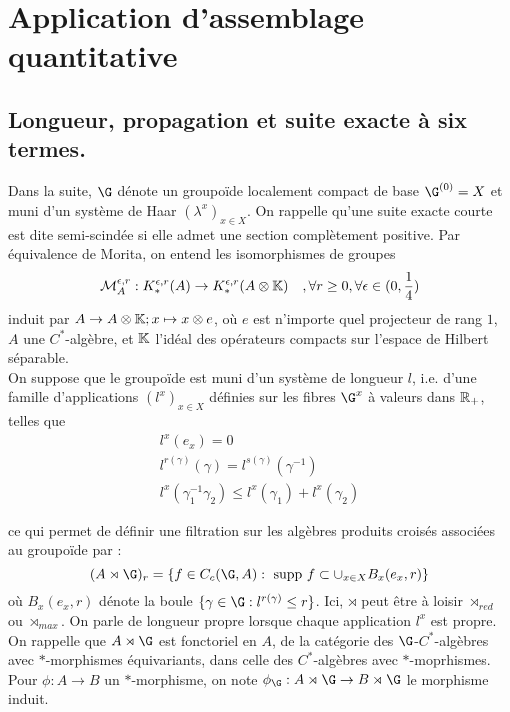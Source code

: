 \section{Application d'assemblage quantitative}

\subsection{Longueur, propagation et suite exacte à six termes.}

Dans la suite, $\G$ dénote un groupoïde localement compact de base $\G^{(0)}=X$ et muni d'un système de Haar $(\lambda^x)_{x\in X}$. On rappelle qu'une suite exacte courte est dite semi-scindée si elle admet une section complètement positive. 
Par équivalence de Morita, on entend les isomorphismes de groupes 
\[\mathcal M_A^{\epsilon , r} : K_*^{\epsilon, r }(A)\rightarrow K_*^{\epsilon,r}(A\otimes \mathbb K)\quad, \forall r\geq 0,\forall \epsilon\in (0,\frac{1}{4})\]
induit par $A\rightarrow A\otimes \mathbb K ; x\mapsto x\otimes e$, où $e$ est n'importe quel projecteur de rang $1$, $A$ une $C^*$-algèbre, et $\mathbb K$ l'idéal des opérateurs compacts sur l'espace de Hilbert séparable.\\

On suppose que le groupoïde est muni d'un système de longueur $l$, i.e. d'une famille d'applications $(l^x)_{x\in X}$ définies sur les fibres $\G^x$ à valeurs dans $\mathbb R_+$, telles que 
\[\begin{array}{l}
l^x(e_x)=0 \\
l^{r(\gamma)}(\gamma)=l^{s(\gamma)}(\gamma^{-1}) \\
l^x (\gamma_1^{-1} \gamma_2)	\leq l^x(\gamma_1)+l^x(\gamma_2) 	
\end{array}\]

ce qui permet de définir une filtration sur les algèbres produits croisés associées au groupoïde par :
\[(A\rtimes \G)_r = \{f\in C_c(\G, A) : \text{ supp }f \subset \cup_{x\in X} B_x(e_x, r)\}\]
où $B_x(e_x, r)$ dénote la boule $\{\gamma \in \G : l^{r(\gamma)}\leq r\}$. Ici, $\rtimes$ peut être à loisir $\rtimes_{red}$ ou $\rtimes_{max}$. On parle de longueur propre lorsque chaque application $l^x$ est propre. On rappelle que $A\rtimes \G$ est fonctoriel en $A$, de la catégorie des $\G$-$C^*$-algèbres avec $*$-morphismes équivariants, dans celle des $C^*$-algèbres avec $*$-moprhismes. Pour $\phi : A\rightarrow B$ un $*$-morphisme, on note $\phi_\G : A\rtimes \G \rightarrow B\rtimes \G$ le morphisme induit. 

